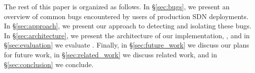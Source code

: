The rest of this paper is organized as follows. In \S\ref{sec:bugs}, we present an overview of common bugs
encountered by users of production SDN deployments. In \S\ref{sec:approach}, we present our approach to
detecting and isolating these bugs. In \S\ref{sec:architecture}, we present the
architecture of our implementation, \projectname{}, and in
\S\ref{sec:evaluation} we evaluate \projectname{}. Finally, in \S\ref{sec:future_work} we discuss our plans
for future work, in \S\ref{sec:related_work} we discuss related work, and in \S\ref{sec:conclusion} we conclude.
